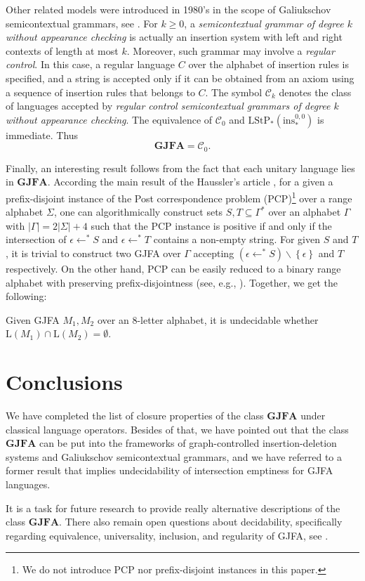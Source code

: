 \documentclass{ws-ijmpc}
\begin{document}
Other related models were introduced in 1980's in the scope of Galiukschov
semicontextual grammars, see \citep{reaPAU6}. For $k\ge0$, a \emph{semicontextual
grammar of degree $k$ without appearance checking} is actually an
insertion system with left and right contexts of length at most $k$.
Moreover, such grammar may involve a \emph{regular control}. In this
case, a regular language $C$ over the alphabet of insertion rules
is specified, and a string is accepted only if it can be obtained
from an axiom using a sequence of insertion rules that belongs to
$C$. The symbol $\mathcal{C}_{k}$ denotes the class of languages
accepted by \emph{regular control semicontextual grammars of degree
$k$ without appearance checking}. The equivalence of $\mathcal{C}_{0}$
and $\mathrm{LStP}_{\ast}\!\left(\mathrm{ins}_{\ast}^{0,0}\right)$
is immediate. Thus 
\[
\mathbf{GJFA}=\mathcal{C}_{0}.
\]


Finally, an interesting result follows from the fact that each unitary
language lies in $\mathbf{GJFA}$. According the main result of the
Haussler's article \citep{reaHAU1}, for a given a prefix-disjoint
instance of the Post correspondence problem (PCP)\footnote{We do not introduce PCP nor prefix-disjoint instances in this paper.} over a range alphabet $\Sigma$, one can algorithmically construct
sets $S,T\subseteq\Gamma^{*}$ over an alphabet $\Gamma$ with $\left|\Gamma\right|=2\left|\Sigma\right|+4$
such that the PCP instance is positive if and only if the intersection
of $\epsilon\leftarrow^{*}S$ and $\epsilon\leftarrow^{*}T$ contains
a non-empty string. For given $S$ and $T$, it is trivial to construct
two GJFA over $\Gamma$ accepting $\left(\epsilon\leftarrow^{*}S\right)\backslash\left\{ \epsilon\right\} $
and $T$ respectively. On the other hand, PCP can be easily reduced
to a binary range alphabet with preserving prefix-disjointness (see,
e.g., \citep{athSAL1}). Together, we get the following:
\begin{theorem}
Given GJFA $M_{1},M_{2}$ over an $8$-letter alphabet, it is undecidable
whether $\mathrm{L}\!\left(M_{1}\right)\cap\mathrm{L}\!\left(M_{2}\right)=\emptyset$.
\end{theorem}

\section{Conclusions}

We have completed the list of closure properties of the class $\mathbf{GJFA}$
under classical language operators. Besides of that, we have pointed
out that the class $\mathbf{GJFA}$ can be put into the frameworks
of graph-controlled insertion-deletion systems and Galiukschov semicontextual
grammars, and we have referred to a former result that implies undecidability
of intersection emptiness for GJFA languages.

It is a task for future research to provide really alternative descriptions
of the class $\mathbf{GJFA}$. There also remain open questions about
decidability, specifically regarding equivalence, universality, inclusion,
and regularity of GJFA, see \citep{athMED1book}.



\end{document}

